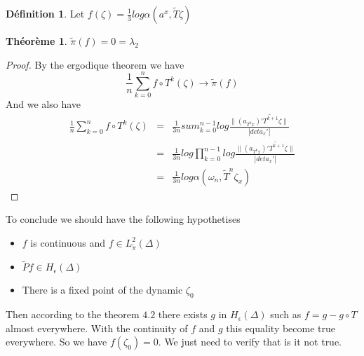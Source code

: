 \documentclass[12pt]{article}
\theoremstyle{plain}%
\newtheorem{thm}{Théorème}[section]
\theoremstyle{definition}
\newtheorem{dfnt}{Définition}[section]
\theoremstyle{remark}
\begin{document}
\begin{dfnt}
Let $f(\zeta)=\frac{1}{3} log \alpha (a^x, \tilde{T} \zeta)$
\end{dfnt}

\begin{thm}
$\tilde{\pi}(f)=0=\lambda_2$
\end{thm}

\begin{proof}
By the ergodique theorem we have \[
\frac{1}{n} \sum_{k=0}^n f \circ T^k (\zeta) \to \tilde{\pi}(f)
\]
And we also have \[\begin{aligned}
\frac{1}{n} \sum_{k=0}^n f \circ T^k (\zeta) & = & \frac{1}{3n} sum_{k=0}^{n-1} log \frac{ \| (a_{T^k x})' \tilde{T^{k+1}} \zeta \| }{| det a_x'|}\\
 &=& \frac{1}{3n} log \prod_{k=0}^{n-1} log \frac{ \| (a_{T^k x})' \tilde{T^{k+1}} \zeta \| }{| det a_x'|} \\
 &=&  \frac{1}{3n} log \alpha(\omega_n,\tilde{T}^n \zeta_x)
\end{aligned}
\]
\end{proof}

To conclude we should have the following hypothetises
\begin{itemize}
\item $f$ is continuous and $f \in L^2_{\tilde{\pi}}(\Delta)$
\item $\tilde{P}f \in H_\epsilon (\Delta)$
\item There is a fixed point of the dynamic $\zeta_0$
\end{itemize}
Then according to the theorem $4.2$ there exists $g$ in $H_\epsilon(\Delta)$ such as $f=g-g \circ T$ almost everywhere. With the continuity of $f$ and $g$ this equality become true everywhere.\newline
So we have $f(\zeta_0)=0$. We just need to verify that is it not true.
\end{document}

